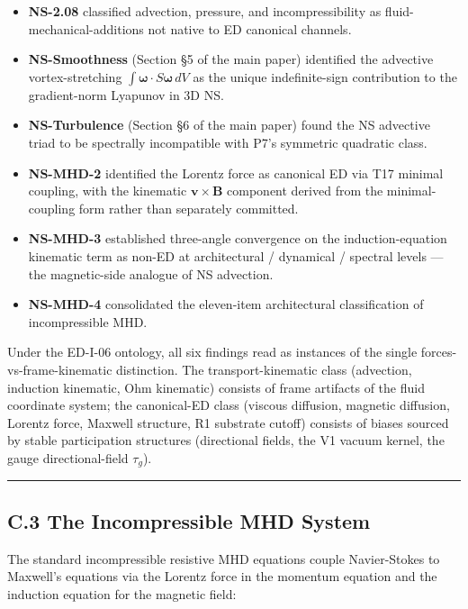 \documentclass[
]{article}
\providecommand{\tightlist}{%
  \setlength{\itemsep}{0pt}\setlength{\parskip}{0pt}}
\begin{document}
\begin{itemize}
\tightlist
\item
  \textbf{NS-2.08} classified advection, pressure, and incompressibility
  as fluid-mechanical-additions not native to ED canonical channels.
\item
  \textbf{NS-Smoothness} (Section §5 of the main paper) identified the
  advective vortex-stretching
  \(\int\boldsymbol{\omega}\cdot S\boldsymbol{\omega}\,dV\) as the
  unique indefinite-sign contribution to the gradient-norm Lyapunov in
  3D NS.
\item
  \textbf{NS-Turbulence} (Section §6 of the main paper) found the NS
  advective triad to be spectrally incompatible with P7's symmetric
  quadratic class.
\item
  \textbf{NS-MHD-2} identified the Lorentz force as canonical ED via T17
  minimal coupling, with the kinematic \(\mathbf{v}\times\mathbf{B}\)
  component derived from the minimal-coupling form rather than
  separately committed.
\item
  \textbf{NS-MHD-3} established three-angle convergence on the
  induction-equation kinematic term as non-ED at architectural /
  dynamical / spectral levels --- the magnetic-side analogue of NS
  advection.
\item
  \textbf{NS-MHD-4} consolidated the eleven-item architectural
  classification of incompressible MHD.
\end{itemize}

Under the ED-I-06 ontology, all six findings read as instances of the
single forces-vs-frame-kinematic distinction. The transport-kinematic
class (advection, induction kinematic, Ohm kinematic) consists of frame
artifacts of the fluid coordinate system; the canonical-ED class
(viscous diffusion, magnetic diffusion, Lorentz force, Maxwell
structure, R1 substrate cutoff) consists of biases sourced by stable
participation structures (directional fields, the V1 vacuum kernel, the
gauge directional-field \(\tau_g\)).

\begin{center}\rule{0.5\linewidth}{0.5pt}\end{center}

\subsection{C.3 The Incompressible MHD
System}\label{c.3-the-incompressible-mhd-system}

The standard incompressible resistive MHD equations couple Navier-Stokes
to Maxwell's equations via the Lorentz force in the momentum equation
and the induction equation for the magnetic field:
\end{document}
